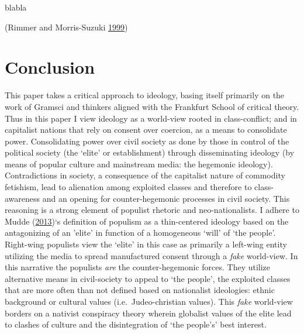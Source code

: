\documentclass[10pt,british,A4paper,,openany]{memoir}
\begin{document}
blabla

\begin{table}[!htb]
\footnotesize
\centering
\setlength{\tabcolsep}{5pt}
\caption{Model of Cyber-Nationalism Applied to Netto-Uyoku}\label{tab:modelcybernationalism}
\end{table}

(Rimmer and Morris-Suzuki
\protect\hyperlink{ref-rimmer_japanese_1999}{1999})

\section{Conclusion}\label{conclusion-1}

This paper takes a critical approach to ideology, basing itself
primarily on the work of Gramsci and thinkers aligned with the Frankfurt
School of critical theory. Thus in this paper I view ideology as a
world-view rooted in class-conflict; and in capitalist nations that rely
on consent over coercion, as a means to consolidate power. Consolidating
power over civil society as done by those in control of the political
society (the `elite' or establishment) through disseminating ideology
(by means of popular culture and mainstream media: the hegemonic
ideology). Contradictions in society, a consequence of the capitalist
nature of commodity fetishism, lead to alienation among exploited
classes and therefore to class-awareness and an opening for
counter-hegemonic processes in civil society. This reasoning is a strong
element of populist rhetoric and neo-nationalists. I adhere to Mudde
(\protect\hyperlink{ref-mudde_oxford_2013}{2013})`s definition of
populism as a thin-centered ideology based on the antagonizing of an
'elite' in function of a homogeneous `will' of `the people'. Right-wing
populists view the `elite' in this case as primarily a left-wing entity
utilizing the media to spread manufactured consent through a \emph{fake}
world-view. In this narrative the populists \emph{are} the
counter-hegemonic forces. They utilize alternative means in
civil-society to appeal to `the people', the exploited classes that are
more often than not defined based on nationalist ideologies: ethnic
background or cultural values (i.e.~Judeo-christian values). This
\emph{fake} world-view borders on a nativist conspiracy theory wherein
globalist values of the elite lead to clashes of culture and the
disintegration of `the people's' best interest.
\end{document}
